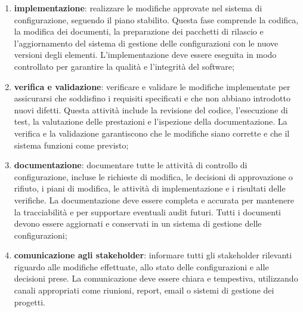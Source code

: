 \begin{enumerate}
	\item \textbf{implementazione}: realizzare le modifiche approvate nel sistema di configurazione, seguendo il piano stabilito. Questa fase comprende la codifica, la modifica dei documenti, la preparazione dei pacchetti di rilascio e l'aggiornamento del sistema di gestione delle configurazioni con le nuove versioni degli elementi. L'implementazione deve essere eseguita in modo controllato per garantire la qualità e l'integrità del software;
	\item \textbf{verifica e validazione}: verificare e validare le modifiche implementate per assicurarsi che soddisfino i requisiti specificati e che non abbiano introdotto nuovi difetti. Questa attività include la revisione del codice, l'esecuzione di test, la valutazione delle prestazioni e l'ispezione della documentazione. La verifica e la validazione garantiscono che le modifiche siano corrette e che il sistema funzioni come previsto;
	\item \textbf{documentazione}: documentare tutte le attività di controllo di configurazione, incluse le richieste di modifica, le decisioni di approvazione o rifiuto, i piani di modifica, le attività di implementazione e i risultati delle verifiche. La documentazione deve essere completa e accurata per mantenere la tracciabilità e per supportare eventuali audit futuri. Tutti i documenti devono essere aggiornati e conservati in un sistema di gestione delle configurazioni;
	\item \textbf{comunicazione agli stakeholder}: informare tutti gli stakeholder rilevanti riguardo alle modifiche effettuate, allo stato delle configurazioni e alle decisioni prese. La comunicazione deve essere chiara e tempestiva, utilizzando canali appropriati come riunioni, report, email o sistemi di gestione dei progetti. 
\end{enumerate}

